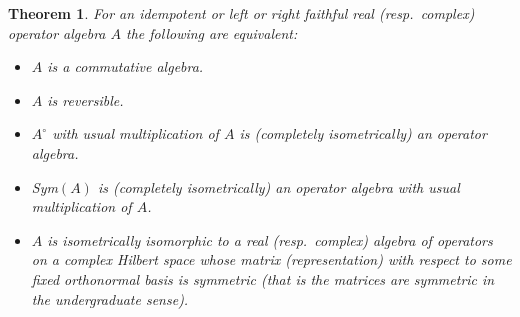 \documentclass{amsart}
\newtheorem{theorem}{Theorem}[section]
\theoremstyle{remark}
\theoremstyle{definition}
\numberwithin{equation}{section}
\begin{document}
 \begin{theorem}  \label{mainc} For an
 idempotent 
 or left or right faithful real  (resp.\ complex)  operator algebra $A$ the following are equivalent:
  \begin{itemize}
\item[(i)] $A$ is a commutative algebra. 
 \item[(ii)] $A$  is reversible.
  \item[(iii)] $A^{\circ}$ with usual multiplication of $A$ is (completely isometrically) an operator algebra.
  \item[(iv)] {\rm Sym}$(A)$ is (completely isometrically) an operator algebra with usual multiplication of $A$.
 \item[(v)]  $A$ is  isometrically isomorphic to a real  (resp.\ complex) algebra of 
 operators on a complex Hilbert space whose matrix (representation) with respect to some fixed orthonormal basis is 
symmetric  (that is the matrices are symmetric in the undergraduate sense).   \end{itemize} 
  \end{theorem} 
\end{document}
